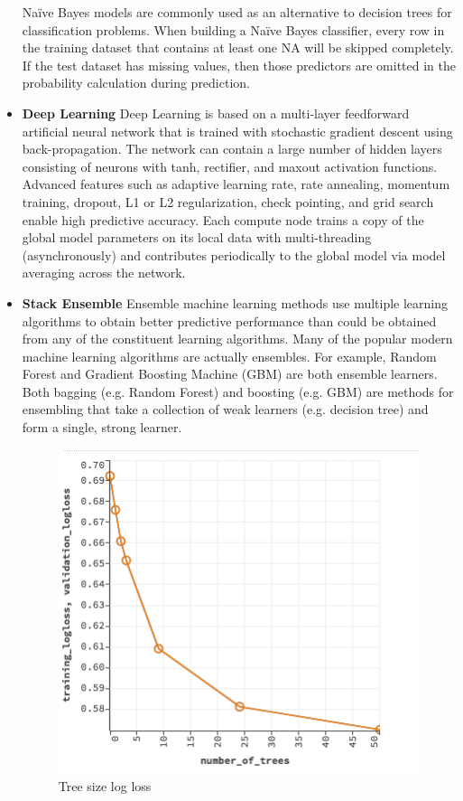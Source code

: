 \documentclass[conference]{IEEEtran}
\begin{document}
\begin{itemize}
Naïve Bayes models are commonly used as an alternative to decision trees for classification problems. When building a Naïve Bayes classifier, every row in the training dataset that contains at least one NA will be skipped completely. If the test dataset has missing values, then those predictors are omitted in the probability calculation during prediction.

  \item \textbf{Deep Learning}
  Deep Learning is based on a multi-layer feedforward artificial neural network that is trained with stochastic gradient descent using back-propagation. The network can contain a large number of hidden layers consisting of neurons with tanh, rectifier, and maxout activation functions. Advanced features such as adaptive learning rate, rate annealing, momentum training, dropout, L1 or L2 regularization, check pointing, and grid search enable high predictive accuracy. Each compute node trains a copy of the global model parameters on its local data with multi-threading (asynchronously) and contributes periodically to the global model via model averaging across the network.

  \item \textbf{Stack Ensemble}
Ensemble machine learning methods use multiple learning algorithms to obtain better predictive performance than could be obtained from any of the constituent learning algorithms. Many of the popular modern machine learning algorithms are actually ensembles. For example, Random Forest and Gradient Boosting Machine (GBM) are both ensemble learners. Both bagging (e.g. Random Forest) and boosting (e.g. GBM) are methods for ensembling that take a collection of weak learners (e.g. decision tree) and form a single, strong learner.

\begin{figure}[!t]
\includegraphics[width=\linewidth]{images/tab2.png}
\caption{Tree size log loss}
\end{figure}


\end{itemize}
\end{document}
